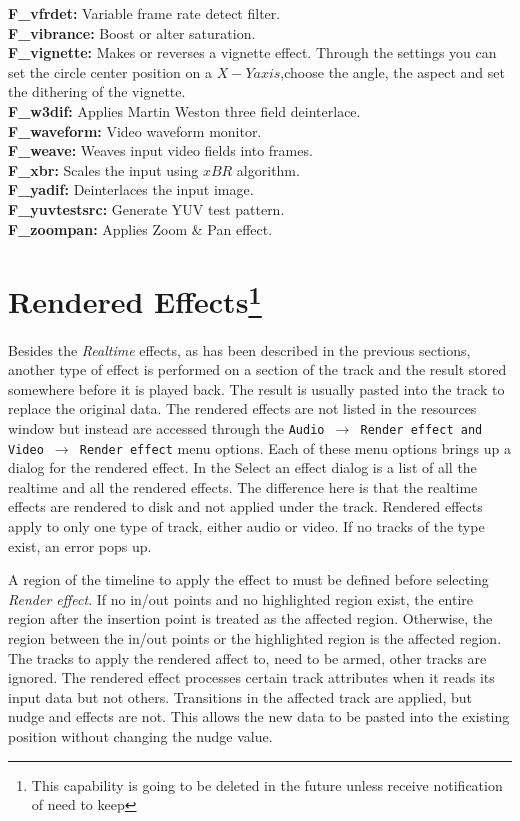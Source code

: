 \textbf{F\_vfrdet:} Variable frame rate detect filter.\\
\textbf{F\_vibrance:} Boost or alter saturation.\\
\textbf{F\_vignette:} Makes or reverses a vignette effect. Through the settings you can set the circle center position on a $X-Y axis$,choose the angle, the aspect and set the dithering of the vignette.\\
\textbf{F\_w3dif:} Applies Martin Weston three field deinterlace.\\
\textbf{F\_waveform:} Video waveform monitor.\\
\textbf{F\_weave:} Weaves input video fields into frames.\\
\textbf{F\_xbr:} Scales the input using $xBR$ algorithm.\\
\textbf{F\_yadif:} Deinterlaces the input image.\\
\textbf{F\_yuvtestsrc:} Generate YUV test pattern.\\
\textbf{F\_zoompan:} Applies Zoom \& Pan effect.

\section[Rendered Effects]{Rendered Effects\protect\footnote{This capability is going to be deleted in the future unless receive notification of need to keep}}%
\label{sec:rendered_effects}

Besides the \textit{Realtime} effects, as has been described in the previous sections, another type of effect is performed on a section of the track and the result stored somewhere before it is played back. The result is usually pasted into the track to replace the original data. The rendered effects are not listed in the resources window but instead are accessed through the \texttt{Audio $\rightarrow$ Render effect and Video $\rightarrow$ Render effect} menu options. Each of these menu options brings up a dialog for the rendered effect. In the Select an effect dialog is a list of all the realtime and all the rendered effects. The difference here is that the realtime effects are rendered to disk and not applied under the track. Rendered effects apply to only one type of track, either audio or video. If no tracks of the type exist, an error pops up.

A region of the timeline to apply the effect to must be defined before selecting \textit{Render effect}. If no in/out points and no highlighted region exist, the entire region after the insertion point is treated as the affected region. Otherwise, the region between the in/out points or the highlighted region is the affected region. The tracks to apply the rendered affect to, need to be armed, other tracks are ignored. The rendered effect processes certain track attributes when it reads its input data but not others. Transitions in the affected track are applied, but nudge and effects are not. This allows the new data to be pasted into the existing position without changing the nudge value.

